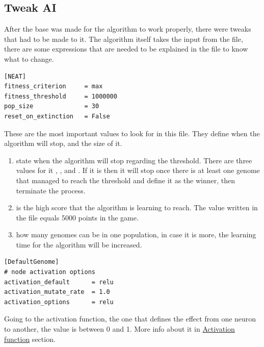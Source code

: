 \subsection{Tweak AI}\label{tweak-ai}

After the base was made for the algorithm to work properly, there were tweaks that had to be made to it. The algorithm itself takes the input from the  file, there are some expressions that are needed to be explained in the file to know what to change.

\begin{listing}[H]
\begin{verbatim}
[NEAT]
fitness_criterion     = max
fitness_threshold     = 1000000
pop_size              = 30
reset_on_extinction   = False
\end{verbatim}
\end{listing}

These are the most important values to look for in this file. They define when the algorithm will stop, and the size of it.

\begin{enumerate}
\item {} state when the algorithm will stop regarding the threshold. There are three values for it , , and . If it is  then it will stop once there is at least one genome that managed to reach the threshold and define it as the winner, then terminate the process.

\item {} is the high score that the algorithm is learning to reach. The value written in the file equals 5000 points in the game.

\item {} how many genomes can be in one population, in case it is more, the learning time for the algorithm will be increased.

\end{enumerate}

\begin{listing}[H]
\begin{verbatim}
[DefaultGenome]
# node activation options
activation_default      = relu
activation_mutate_rate  = 1.0
activation_options      = relu
\end{verbatim}
\end{listing}

Going to the activation function, the one that defines the effect from one neuron to another, the value is between 0 and 1. More info about it in \hyperref[sec:activation-function]{Activation function} section.  


